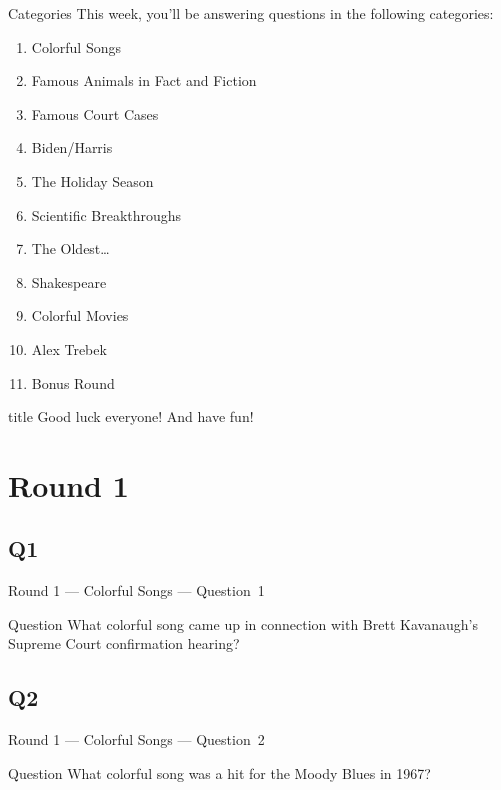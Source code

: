 \documentclass[11pt]{beamer}
\begin{document}
\begingroup{}
\begingroup{}
\begin{frame}[t]{Categories}
This week, you'll be answering questions in the following categories:
\begin{enumerate}
\item Colorful Songs
\item Famous Animals in Fact and Fiction
\item Famous Court Cases
\item Biden/Harris
\item The Holiday Season
\item Scientific Breakthroughs
\item The Oldest…
\item Shakespeare
\item Colorful Movies
\item Alex Trebek
\item Bonus Round
\end{enumerate}
\end{frame}
\endgroup{}

\begingroup{}
\begin{frame}
\vfill{}
\begin{beamercolorbox}[sep=8pt,center,shadow=true,rounded=true]{title}
Good luck everyone! And have fun!
\end{beamercolorbox}
\vfill{}
\end{frame}
\endgroup{}
\def\thisSectionName{Colorful Songs}
\section{Round 1}
\subsection*{Q1}
\begin{frame}[t]{Round 1 --- Colorful Songs --- \mbox{Question 1}}
\vspace{-0.5em}
\begin{block}{Question}
What colorful song came up in connection with Brett Kavanaugh's Supreme Court confirmation hearing?
\end{block}
\end{frame}
\subsection*{Q2}
\begin{frame}[t]{Round 1 --- Colorful Songs --- \mbox{Question 2}}
\vspace{-0.5em}
\begin{block}{Question}
What colorful song was a hit for the Moody Blues in 1967?
\end{block}
\end{frame}
\end{document}
